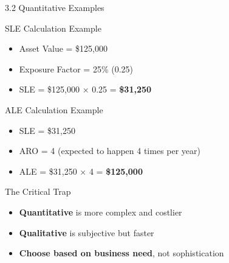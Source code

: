 \documentclass[9pt]{beamer}  %
\begin{document}
	\begin{frame}{3.2 Quantitative Examples}
		\begin{block}{SLE Calculation Example}
			\begin{itemize}
				\item Asset Value = \$125,000
				\item Exposure Factor = 25\% (0.25)
				\item SLE = \$125,000 × 0.25 = \textbf{\$31,250}
			\end{itemize}
		\end{block}
		
		\begin{block}{ALE Calculation Example}
			\begin{itemize}
				\item SLE = \$31,250
				\item ARO = 4 (expected to happen 4 times per year)
				\item ALE = \$31,250 × 4 = \textbf{\$125,000}
			\end{itemize}
		\end{block}
		
		\begin{alertblock}{The Critical Trap}
			\begin{itemize}
				\item \textbf{Quantitative} is more complex and costlier
				\item \textbf{Qualitative} is subjective but faster
				\item \textbf{Choose based on business need}, not sophistication
			\end{itemize}
		\end{alertblock}
	\end{frame}
	
\end{document}
